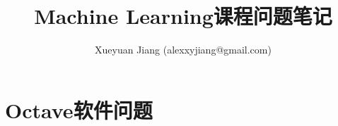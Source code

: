 \documentclass[UTF8]{ctexart}
\begin{document}
\title{Machine Learning课程问题笔记}
\author{Xueyuan Jiang (alexxyjiang@gmail.com)}
\date{}
\maketitle
\pagestyle{plain}

\section{Octave软件问题}
\begin{enumerate}

\end{enumerate}
\end{document}
